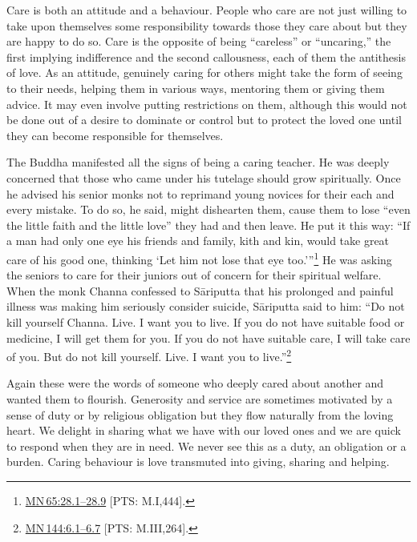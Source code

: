 \documentclass[10pt, openright]{book}
\begin{document}
Care is both an attitude and a behaviour. People who care are not just willing to take upon themselves some responsibility towards those they care about but they are happy to do so. Care is the opposite of being “careless” or “uncaring,” the first implying indifference and the second callousness, each of them the antithesis of love. As an attitude, genuinely caring for others might take the form of seeing to their needs, helping them in various ways, mentoring them or giving them advice. It may even involve putting restrictions on them, although this would not be done out of a desire to dominate or control but to protect the loved one until they can become responsible for themselves.


The Buddha manifested all the signs of being a caring teacher. He was deeply concerned that those who came under his tutelage should grow spiritually. Once he advised his senior monks not to reprimand young novices for their each and every mistake. To do so, he said, might dishearten them, cause them to lose “even the little faith and the little love” they had and then leave. He put it this way: “If a man had only one eye his friends and family, kith and kin, would take great care of his good one, thinking ‘Let him not lose that eye too.’”\footnote {\href{https://suttacentral.net/mn65/en/sujato\#28.1}{MN 65:28.1–28.9} [PTS: M.I,444].} He was asking the seniors to care for their juniors out of concern for their spiritual welfare. When the monk Channa confessed to Sāriputta that his prolonged and painful illness was making him seriously consider suicide, Sāriputta said to him: “Do not kill yourself Channa. Live. I want you to live. If you do not have suitable food or medicine, I will get them for you. If you do not have suitable care, I will take care of you. But do not kill yourself. Live. I want you to live.”\footnote {\href{https://suttacentral.net/mn144/en/sujato\#6.1}{MN 144:6.1–6.7} [PTS: M.III,264].}


Again these were the words of someone who deeply cared about another and wanted them to flourish. Generosity and service are sometimes motivated by a sense of duty or by religious obligation but they flow naturally from the loving heart. We delight in sharing what we have with our loved ones and we are quick to respond when they are in need. We never see this as a duty, an obligation or a burden. Caring behaviour is love transmuted into giving, sharing and helping.
\end{document}
